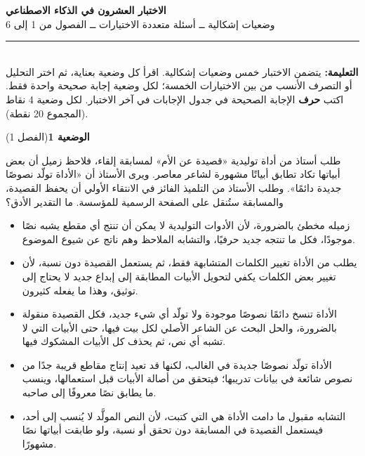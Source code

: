 \documentclass[11pt,a4paper]{article}
\begin{document}
\linespread{1.08}\selectfont
\begin{center}
{\LARGE\khatt\textbf{الاختبار العشرون في الذكاء الاصطناعي}}\\[4pt]
{\normalsize وضعيات إشكالية ــ أسئلة متعددة الاختيارات ــ الفصول من 1 إلى 6}
\end{center}
\vspace{-2pt}\rule{\textwidth}{0.6pt}\\[2pt]
\textbf{التعليمة:} يتضمن الاختبار خمس وضعيات إشكالية. اقرأ كل وضعية بعناية، ثم اختر التحليل أو التصرف الأنسب
من بين الاختيارات الخمسة؛ لكل وضعية إجابة صحيحة واحدة فقط.
اكتب \textbf{حرف} الإجابة الصحيحة في جدول الإجابات في آخر الاختبار.
لكل وضعية 4 نقاط (المجموع 20 نقطة).
\vspace{4pt}

\noindent
{\large\khatt\textbf{الوضعية 1}}\hfill{\small(الفصل 1)}\par\nopagebreak\vspace{3pt}
\setlength{\fboxsep}{7pt}\colorbox{gray!10}{\parbox{\dimexpr\linewidth-14pt}{طلب أستاذ من أداة توليدية «قصيدة عن الأم» لمسابقة إلقاء، فلاحظ زميل أن بعض أبياتها تكاد تطابق أبياتًا مشهورة لشاعر معاصر. ويرى الأستاذ أن «الأداة تولّد نصوصًا جديدة دائمًا». وطلب الأستاذ من التلميذ الفائز في الانتقاء الأولي أن يحفظ القصيدة، والمسابقة ستُنقل على الصفحة الرسمية للمؤسسة. ما التقدير الأدق؟}}\par\nopagebreak
\begin{itemize}[leftmargin=1.0cm, labelsep=6pt, itemsep=3pt, topsep=4pt, parsep=0pt]
  \item[\textbf{أ)}] زميله مخطئ بالضرورة، لأن الأدوات التوليدية لا يمكن أن تنتج أي مقطع يشبه نصًا موجودًا، فكل ما تنتجه جديد حرفيًا، والتشابه الملاحظ وهم ناتج عن شيوع الموضوع.
  \item[\textbf{ب)}] يطلب من الأداة تغيير الكلمات المتشابهة فقط، ثم يستعمل القصيدة دون نسبة، لأن تغيير بعض الكلمات يكفي لتحويل الأبيات المطابقة إلى إبداع جديد لا يحتاج إلى توثيق، وهذا ما يفعله كثيرون.
  \item[\textbf{ج)}] الأداة تنسخ دائمًا نصوصًا موجودة ولا تولّد أي شيء جديد، فكل القصيدة منقولة بالضرورة، والحل البحث عن الشاعر الأصلي لكل بيت فيها، حتى الأبيات التي لا تشبه أي نص، ثم يحذف كل الأبيات المشكوك فيها.
  \item[\textbf{د)}] الأداة تولّد نصوصًا جديدة في الغالب، لكنها قد تعيد إنتاج مقاطع قريبة جدًا من نصوص شائعة في بيانات تدريبها؛ فيتحقق من أصالة الأبيات قبل استعمالها، وينسب ما يطابق نصًا معروفًا إلى صاحبه.
  \item[\textbf{هـ)}] التشابه مقبول ما دامت الأداة هي التي كتبت، لأن النص المولَّد لا يُنسب إلى أحد، فيستعمل القصيدة في المسابقة دون تحقق أو نسبة، ولو طابقت أبياتها نصًا مشهورًا.
\end{itemize}
\end{document}
